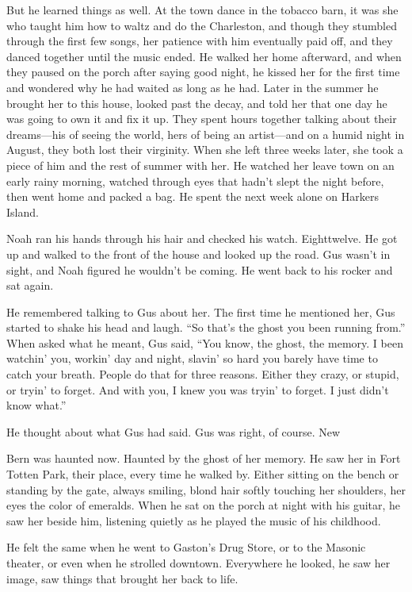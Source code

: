 \documentclass[10pt, twoside, openright]{book}
\begin{document}
But he learned things as well. At the town dance in the tobacco barn, it
was she who taught him how to waltz and do the Charleston, and though
they stumbled through the first few songs, her patience with him
eventually paid off, and they danced together until the music ended. He
walked her home afterward, and when they paused on the porch after
saying good night, he kissed her for the first time and wondered why he
had waited as long as he had. Later in the summer he brought her to this
house, looked past the decay, and told her that one day he was going to
own it and fix it up. They spent hours together talking about their
dreams---his of seeing the world, hers of being an artist---and on a
humid night in August, they both lost their virginity. When she left
three weeks later, she took a piece of him and the rest of summer with
her. He watched her leave town on an early rainy morning, watched
through eyes that hadn't slept the night before, then went home and
packed a bag. He spent the next week alone on Harkers Island.

Noah ran his hands through his hair and checked his watch. Eighttwelve.
He got up and walked to the front of the house and looked up the road.
Gus wasn't in sight, and Noah figured he wouldn't be coming. He went
back to his rocker and sat again.

He remembered talking to Gus about her. The first time he mentioned her,
Gus started to shake his head and laugh. ``So that's the ghost you been
running from.'' When asked what he meant, Gus said, ``You know, the
ghost, the memory. I been watchin' you, workin' day and night, slavin'
so hard you barely have time to catch your breath. People do that for
three reasons. Either they crazy, or stupid, or tryin' to forget. And
with you, I knew you was tryin' to forget. I just didn't know what.''


He thought about what Gus had said. Gus was right, of course. New


Bern was haunted now. Haunted by the ghost of her memory. He saw her in
Fort Totten Park, their place, every time he walked by. Either sitting
on the bench or standing by the gate, always smiling, blond hair softly
touching her shoulders, her eyes the color of emeralds. When he sat on
the porch at night with his guitar, he saw her beside him, listening
quietly as he played the music of his childhood.

He felt the same when he went to Gaston's Drug Store, or to the Masonic
theater, or even when he strolled downtown. Everywhere he looked, he saw
her image, saw things that brought her back to life.
\end{document}
